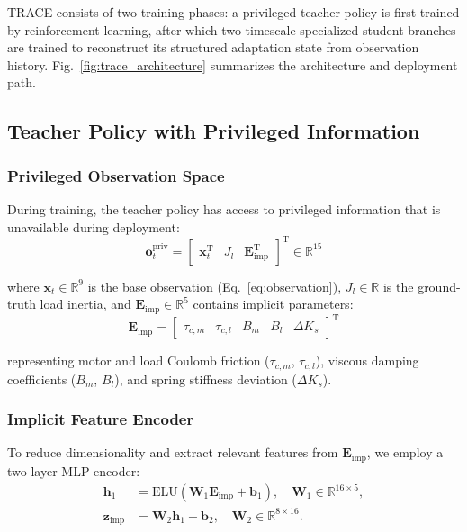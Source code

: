 \documentclass[letterpaper,journal]{IEEEtran}
\begin{document}
TRACE consists of two training phases: a privileged teacher policy is first trained by reinforcement learning, after which two timescale-specialized student branches are trained to reconstruct its structured adaptation state from observation history. Fig.~\ref{fig:trace_architecture} summarizes the architecture and deployment path.

\subsection{Teacher Policy with Privileged Information}

\subsubsection{Privileged Observation Space}

During training, the teacher policy has access to privileged information that is unavailable during deployment:
\begin{equation}
\bm{o}_t^{\text{priv}} = \begin{bmatrix}
\bm{x}_t^\mathrm{T} & J_l & \bm{E}_{\text{imp}}^\mathrm{T}
\end{bmatrix}^\mathrm{T} \in \mathbb{R}^{15} \label{eq:priv_obs}
\end{equation}

\noindent where $\bm{x}_t \in \mathbb{R}^9$ is the base observation (Eq.~\ref{eq:observation}), $J_l \in \mathbb{R}$ is the ground-truth load inertia, and $\bm{E}_{\text{imp}} \in \mathbb{R}^5$ contains implicit parameters:
\begin{equation}
\bm{E}_{\text{imp}} = \begin{bmatrix}
\tau_{c,m} & \tau_{c,l} & B_m & B_l & \Delta K_s
\end{bmatrix}^\mathrm{T} \label{eq:implicit_params}
\end{equation}

\noindent representing motor and load Coulomb friction ($\tau_{c,m}$, $\tau_{c,l}$), viscous damping coefficients ($B_m$, $B_l$), and spring stiffness deviation ($\Delta K_s$).

\subsubsection{Implicit Feature Encoder}

To reduce dimensionality and extract relevant features from $\bm{E}_{\text{imp}}$, we employ a two-layer MLP encoder:
\begin{equation}
\begin{aligned}
\bm{h}_1 &= \text{ELU}(\bm{W}_1 \bm{E}_{\text{imp}} + \bm{b}_1), \quad \bm{W}_1 \in \mathbb{R}^{16 \times 5}, \\
\bm{z}_{\text{imp}} &= \bm{W}_2 \bm{h}_1 + \bm{b}_2, \quad \bm{W}_2 \in \mathbb{R}^{8 \times 16}.
\end{aligned}
\label{eq:encoder_z}
\end{equation}
\end{document}
